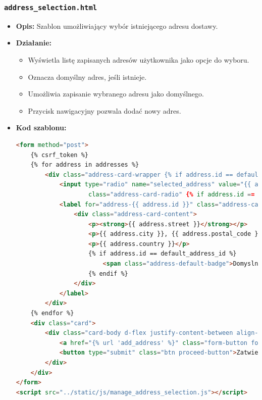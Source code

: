 \documentclass[12pt,a4paper,oneside]{article}
\theoremstyle{definition}
\numberwithin{equation}{section}
\begin{document}
\subsubsection*{\texttt{address\_selection.html}}
\label{sec:address_selection_template}
\begin{itemize}
    \item \textbf{Opis:} Szablon umożliwiający wybór istniejącego adresu dostawy.  
    \item \textbf{Działanie:}
        \begin{itemize}
            \item Wyświetla listę zapisanych adresów użytkownika jako opcje do wyboru.
            \item Oznacza domyślny adres, jeśli istnieje.
            \item Umożliwia zapisanie wybranego adresu jako domyślnego.
            \item Przycisk nawigacyjny pozwala dodać nowy adres.
        \end{itemize}
    \item \textbf{Kod szablonu:}
\begin{lstlisting}[language=HTML, caption=Szablon address\_selection.html]
<form method="post">
    {% csrf_token %}
    {% for address in addresses %}
        <div class="address-card-wrapper {% if address.id == default_address_id %}address-default{% endif %}">
            <input type="radio" name="selected_address" value="{{ address.id }}" id="address-{{ address.id }}"
                    class="address-card-radio" {% if address.id == default_address_id %}checked{% endif %}>
            <label for="address-{{ address.id }}" class="address-card-label">
                <div class="address-card-content">
                    <p><strong>{{ address.street }}</strong></p>
                    <p>{{ address.city }}, {{ address.postal_code }}</p>
                    <p>{{ address.country }}</p>
                    {% if address.id == default_address_id %}
                        <span class="address-default-badge">Domyslny</span>
                    {% endif %}
                </div>
            </label>
        </div>
    {% endfor %}
    <div class="card">
        <div class="card-body d-flex justify-content-between align-items-center">
            <a href="{% url 'add_address' %}" class="form-button form-button-secondary">Dodaj nowy adres</a>
            <button type="submit" class="btn proceed-button">Zatwierdz adres</button>
        </div>
    </div>
</form>
<script src="../static/js/manage_address_selection.js"></script>
\end{lstlisting}
\end{itemize}
\end{document}
